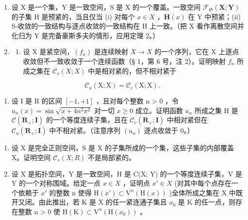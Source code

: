 \begin{enumerate}
\def\labelenumi{\arabic{enumi})}
\setcounter{enumi}{8}
\item
  设 X 是一个集，Y 是一致空间，S 是 X 的一个覆盖。一致空间 \(\mathcal{F}_{\mathfrak{S}}(\mathbf{X};\mathbf{Y})\) 的子集 H 是预紧的，当且仅当 (i) 对每个 \(x\in X\) ，\(\mathbf{H}(x)\) 在 Y 中预紧；(ii) S-收敛的一致结构与逐点收敛的一致结构在 H 上一致。（把 X 看作离散空间并化归为 Y 是完备豪斯多夫的情形，应用定理 2。）
\item
  \begin{enumerate}
  \def\labelenumii{\alph{enumii})}
  \tightlist
  \item
    设 X 是紧空间，\((f_{n})\) 是连续映射 \(X \rightarrow X\) 的一个序列，它在 X 上逐点收敛但不一致收敛于一个连续函数（§ 1，第 6 号，注 2）。证明映射 \(f_{n}\) 所成之集在 \(\mathcal{C}_{s}(X; X)\) 中是相对紧的，但不相对紧于
  \end{enumerate}
\end{enumerate}

\[
\mathcal {C} _ {u} (\mathrm{X}; \mathrm{X}) = \mathcal {C} _ {c} (\mathrm{X}; \mathrm{X}).
\]

\begin{enumerate}
\def\labelenumi{\alph{enumi})}
\setcounter{enumi}{1}
\tightlist
\item
  设 I 是 R 的区间 \([-1, +1]\) ，且对每个整数 n \textgreater{} 0 ，令 \(u_{n}(x) = \sin \sqrt{x + 4n^{2}\pi^{2}}\) 对一切 \(x \geqslant 0\) 成立。证明函数 \(u_{n}\) 所成之集 H 是 \(\mathcal{C}(\mathbf{R}_{+}; \mathbf{I})\) 的一个等度连续子集，且在 \(\mathcal{C}_{c}(\mathbf{R}_{+}; \mathbf{I})\) 中相对紧但在 \(\mathcal{C}_{u}(\mathbf{R}_{+}; \mathbf{I})\) 中不相对紧。（注意序列 \((u_{n})\) 逐点收敛于 0。）
\end{enumerate}

\begin{enumerate}
\def\labelenumi{\arabic{enumi})}
\setcounter{enumi}{10}
\item
  设 X 是完全正则空间，S 是 X 的子集所成的一个集，这些子集的内部覆盖 X。证明空间 \(\mathcal{C}_{s}(X;R)\) 不是局部紧的。
\item
  设 X 是拓扑空间，Y 是一致空间，H 是 C(X; Y) 的一个等度连续子集，V 是 Y 的一个对称围域。给定一点 \(x \in X\) ，证明点 \(x' \in X\) (对其中每个点存在一个依赖于 \(x'\) 的整数 n 使得 \(\mathrm{H}(x') \subset \mathrm{V}^n(\mathrm{H}(x))\) )全体所成之集在 X 中既开又闭。由此推出，若 K 是 X 的任一紧连通子集且 \(x_0\) 是 K 的任一点，则存在整数 n \textgreater{} 0 使 \(\mathrm{H}(\mathrm{K}) \subset \mathrm{V}^n(\mathrm{H}(x_0))\) 。
\end{enumerate}

